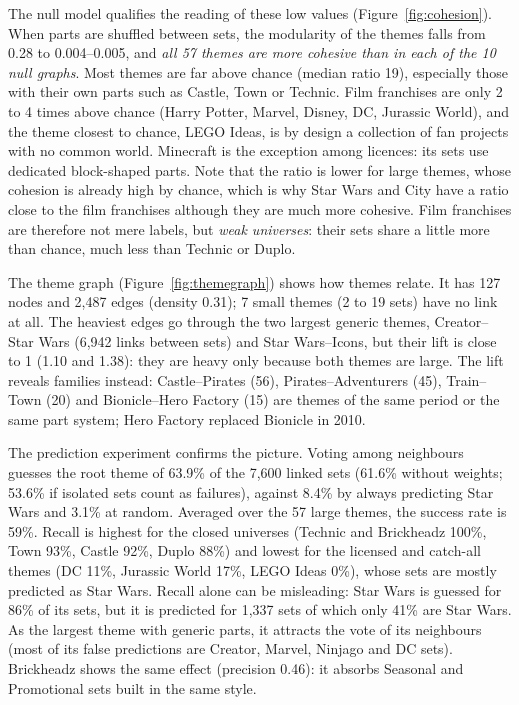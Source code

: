 \documentclass[10pt,a4paper]{article}
\begin{document}
The null model qualifies the reading of these low values
(Figure~\ref{fig:cohesion}). When parts are shuffled between sets, the
modularity of the themes falls from 0.28 to 0.004--0.005, and \emph{all 57
themes are more cohesive than in each of the 10 null graphs}. Most themes are far above chance (median ratio 19), especially those with
their own parts such as Castle, Town or Technic. Film franchises are only 2 to
4 times above chance (Harry Potter, Marvel, Disney, DC, Jurassic World), and
the theme closest to chance, LEGO Ideas, is by design a collection of fan
projects with no common world. Minecraft is the exception among licences: its
sets use dedicated block-shaped parts. Note that the ratio is lower for large
themes, whose cohesion is already high by chance, which is why Star Wars and
City have a ratio close to the film franchises although they are much more
cohesive. Film franchises are therefore not mere labels, but \emph{weak
universes}: their sets share a little more than chance, much less than Technic
or Duplo.

The theme graph (Figure~\ref{fig:themegraph}) shows how themes relate. It has
127 nodes and 2,487 edges (density 0.31); 7 small themes (2 to 19 sets) have no
link at all. The heaviest edges go through the two largest generic themes,
Creator--Star Wars (6,942 links between sets) and Star Wars--Icons, but their
lift is close to 1 (1.10 and 1.38): they are heavy only because both themes are
large. The lift reveals families instead: Castle--Pirates (56),
Pirates--Adventurers (45), Train--Town (20) and Bionicle--Hero Factory (15)
are themes of the same period or the same part system; Hero Factory replaced
Bionicle in 2010.

The prediction experiment confirms the picture. Voting among neighbours
guesses the root theme of 63.9\% of the 7,600 linked sets (61.6\% without
weights; 53.6\% if isolated sets count as failures), against 8.4\% by always
predicting Star Wars and 3.1\% at random. Averaged over the 57 large themes,
the success rate is 59\%. Recall is highest for the closed universes (Technic
and Brickheadz 100\%, Town 93\%, Castle 92\%, Duplo 88\%) and lowest for the
licensed and catch-all themes (DC 11\%, Jurassic World 17\%, LEGO Ideas 0\%),
whose sets are mostly predicted as Star Wars. Recall alone can be misleading:
Star Wars is guessed for 86\% of its sets, but it is predicted for 1,337 sets
of which only 41\% are Star Wars. As the largest theme with generic parts, it
attracts the vote of its neighbours (most of its false predictions are Creator,
Marvel, Ninjago and DC sets). Brickheadz shows the same effect (precision
0.46): it absorbs Seasonal and Promotional sets built in the same style.
\end{document}
